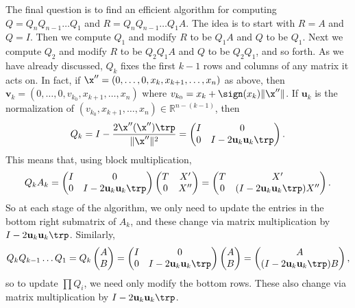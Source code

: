 The final question is to find an efficient algorithm for computing $Q = Q_nQ_{n-1} \ldots Q_1$ and $R = Q_nQ_{n-1} \ldots Q_1A$. 
The idea is to start with $R=A$ and $Q = I$. Then we compute $Q_1$ and modify $R$ to be $Q_1A$ and $Q$ to be $Q_1$. 
Next we compute $Q_2$ and modify $R$ to be $Q_2Q_1A$ and $Q$ to be $Q_2Q_1$, and so forth. 
As we have already discussed, $Q_k$ fixes the first $k-1$ rows and columns of any matrix it acts on. 
In fact, if $\x'' = (0, \ldots, 0, x_k, x_{k+1}, \ldots, x_n)$ as above, then $\mathbf{v}_k = (0, \ldots, 0, v_{k_0}, x_{k+1}, \ldots, x_n)$ where $v_{k_0} = x_k + \sign(x_k) \| \x'' \|$. 
If $\mathbf{u}_k$ is the normalization of $(v_{k_0}, x_{k+1}, \ldots, x_n) \in \mathbb{R}^{n-(k-1)}$, then
\[
Q_k = I-\frac{2\x''(\x'')\trp}{\|\x''\|^2} =  \begin{pmatrix}
I & 0 \\
0 & I-2\mathbf{u}_k\mathbf{u}_k\trp
\end{pmatrix}.
\]
This means that, using block multiplication,
\[
Q_kA_k =  \begin{pmatrix}
I & 0 \\
0 & I-2\mathbf{u}_k\mathbf{u}_k\trp
\end{pmatrix}\begin{pmatrix}
T & X' \\
0 & X''
\end{pmatrix} = \begin{pmatrix}
T & X' \\
0 & ( I-2\mathbf{u}_k\mathbf{u}_k\trp)X''
\end{pmatrix}.
\]
So at each stage of the algorithm, we only need to update the entries in the bottom right submatrix of $A_k$, and these change via matrix multiplication by $ I-2\mathbf{u}_k\mathbf{u}_k\trp$. Similarly,
\[
Q_kQ_{k-1}\ldots Q_1 = Q_k \begin{pmatrix}
A\\
B
\end{pmatrix} = \begin{pmatrix}
I & 0 \\
0 & I-2\mathbf{u}_k\mathbf{u}_k\trp
\end{pmatrix}\begin{pmatrix}
A\\
B
\end{pmatrix} = \begin{pmatrix}
A\\
(I-2\mathbf{u}_k\mathbf{u}_k\trp)B
\end{pmatrix},
\]
so to update $\prod Q_i$, we need only modify the bottom rows. 
These also change via matrix multiplication by $I-2\mathbf{u}_k\mathbf{u}_k\trp$.

